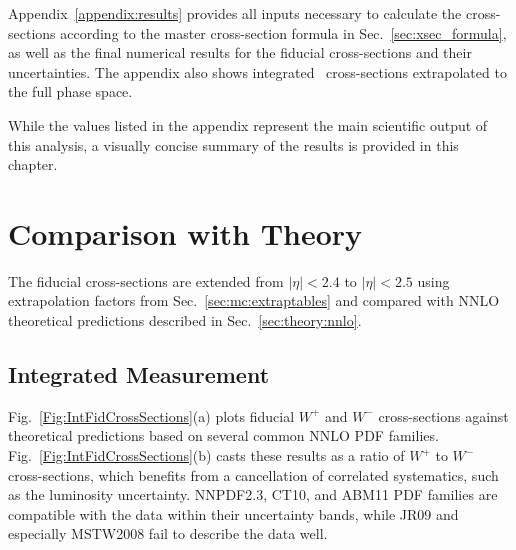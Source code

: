 
Appendix~\ref{appendix:results} provides all inputs necessary to calculate the cross-sections according to the master cross-section formula in Sec.~\ref{sec:xsec_formula}, as well as the final numerical results for the fiducial cross-sections and their uncertainties. The appendix also shows integrated \Wpm\ cross-sections extrapolated to the full phase space.

While the values listed in the appendix represent the main scientific output of this analysis, a visually concise summary of the results is provided in this chapter.

\section{ Comparison with Theory }
The fiducial cross-sections are extended from $|\eta|<2.4$ to $|\eta|<2.5$ using extrapolation factors from Sec.~\ref{sec:mc:extraptables} and compared with NNLO theoretical predictions described in Sec.~\ref{sec:theory:nnlo}.

\subsection{ Integrated Measurement }

Fig.~\ref{Fig:IntFidCrossSections}(a) plots fiducial $W^+$ and $W^-$ cross-sections against theoretical predictions based on several common NNLO PDF families. Fig.~\ref{Fig:IntFidCrossSections}(b) casts these results as a ratio of $W^+$ to $W^-$ cross-sections, which benefits from a cancellation of correlated systematics, such as the luminosity uncertainty. NNPDF2.3, CT10, and ABM11 PDF families are compatible with the data within their uncertainty bands, while JR09 and especially MSTW2008 fail to describe the data well.



